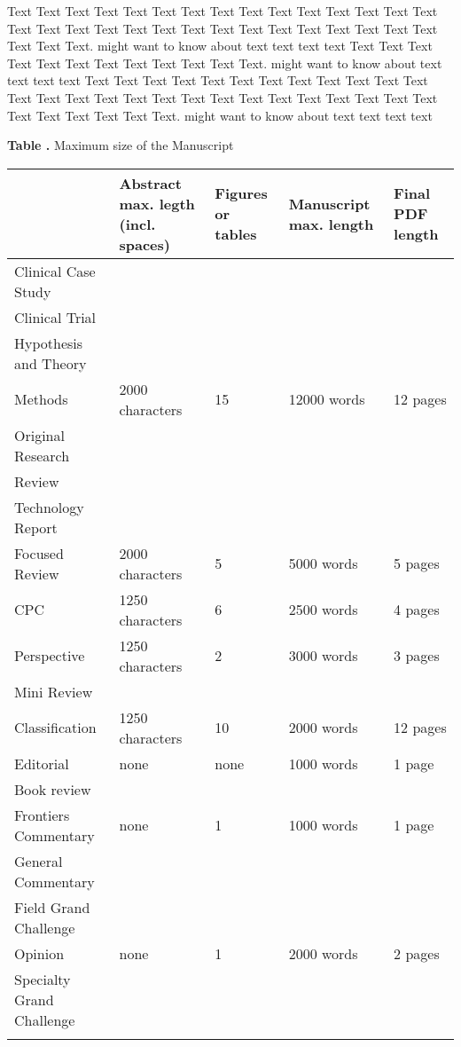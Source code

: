 \documentclass{frontiersSCNS} %
\begin{document}
Text Text Text Text Text Text  Text Text Text Text Text Text Text Text Text  Text Text Text Text Text Text Text Text Text Text  Text Text Text Text Text Text  Text Text.  \cite{Neuro2013} might want to know about  text text text text Text Text Text Text  Text Text Text Text Text Text  Text Text. \citep{Gene2012} might want to know about  text text text text
Text Text Text Text Text Text  Text Text Text Text Text Text Text Text Text  Text Text Text Text Text Text Text Text Text Text  Text Text Text Text Text Text  Text Text.  \cite{Neurobot2013} might want to know about  text text text text

\begin{table}[!t]
\textbf{\label{Tab:01} Table .}{ Maximum size of the Manuscript }

\processtable{ }
{\begin{tabular}{lllll}\toprule
 & Abstract max. legth (incl. spaces) & Figures or tables & Manuscript max. length & Final PDF length\\\midrule
Clinical Case Study & & & &\\
Clinical Trial & & & &\\
Hypothesis and Theory & & & &\\
Methods & 2000 characters  & 15 & 12000 words & 12 pages\\
Original Research & & & &\\
Review & & & &\\
Technology Report & & & &\\
Focused Review & 2000 characters & 5 & 5000 words & 5 pages\\
CPC &  1250 characters& 6 & 2500 words & 4 pages\\
Perspective & 1250 characters & 2 & 3000 words & 3 pages\\
Mini Review & & & &\\
Classification & 1250 characters & 10 & 2000 words & 12 pages\\
Editorial & none & none & 1000 words & 1 page \\
Book review & & & &\\
Frontiers Commentary & none & 1 & 1000 words & 1 page\\
General Commentary & & & &\\
Field Grand Challenge & & & &\\
Opinion & none & 1 & 2000 words & 2 pages\\
Specialty Grand Challenge& & & &\\\botrule
\end{tabular}}{}
\end{table}
\end{document}
